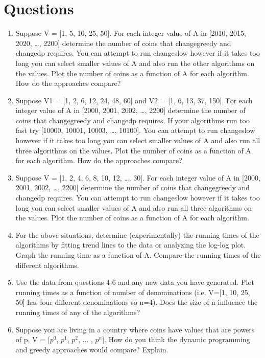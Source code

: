 \documentclass[11pt,letterpaper]{article}
\begin{document}
\section*{Questions}
\begin{enumerate}
	\item Suppose V = [1, 5, 10, 25, 50]. For each integer value of A in [2010, 2015, 2020, …, 2200] determine the number of coins that changegreedy and changedp requires. You can attempt to run changeslow however if it takes too long you can select smaller values of A and also run the other algorithms on the values. Plot the number of coins as a function of A for each algorithm. How do the approaches compare?
	\item Suppose V1 = [1, 2, 6, 12, 24, 48, 60] and V2 = [1, 6, 13, 37, 150]. For each integer value of A in [2000, 2001, 2002, …, 2200] determine the number of coins that changegreedy and changedp requires. If your algorithms run too fast try [10000, 10001, 10003, …, 10100]. You can attempt to run changeslow however if it takes too long you can select smaller values of A and also run all three algorithms on the values. Plot the number of coins as a function of A for each algorithm. How do the approaches compare?
	\item Suppose V = [1, 2, 4, 6, 8, 10, 12, …, 30]. For each integer value of A in [2000, 2001, 2002, …, 2200] determine the number of coins that changegreedy and changedp requires. You can attempt to run changeslow however if it takes too long you can select smaller values of A and also run all three algorithms on the values. Plot the number of coins as a function of A for each algorithm.
	\item For the above situations, determine (experimentally) the running times of the algorithms by fitting trend lines to the data or analyzing the log-log plot. Graph the running time as a function of A. Compare the running times of the different algorithms.
	\item Use the data from questions 4-6 and any new data you have generated. Plot running times as a function of number of denominations (i.e. V=[1, 10, 25, 50] has four different denominations so n=4). Does the size of n influence the running times of any of the algorithms?
	\item Suppose you are living in a country where coins have values that are powers of p, V = [$p^0$, $p^1$, $p^2$, ... , $p^n$]. How do you think the dynamic programming and greedy approaches would compare? Explain.
\end{enumerate}
\end{document}
